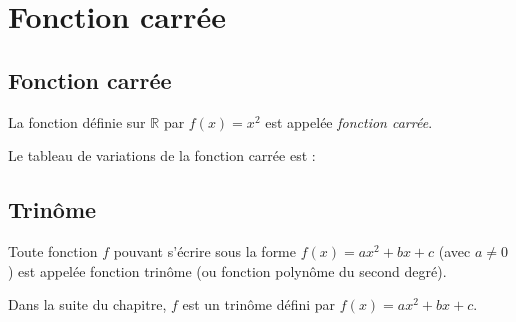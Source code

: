 \chapter{Fonction carrée}
\section{Fonction carrée}

\begin{definition}
  La fonction définie sur $\mathbb R$ par $f(x)=x^2$ est appelée \emph{fonction carrée}.
\end{definition}

\begin{propriete}[Variations]
  Le tableau de variations de la fonction carrée est :
  \begin{center}
    \hfill
  \end{center}

\end{propriete}

\section{Trinôme}

\begin{definition}
  Toute fonction $f$ pouvant s'écrire sous la forme $f(x)=ax^2+bx+c$ (avec $a\neq0$) est appelée fonction trinôme (ou fonction polynôme du second degré).
\end{definition}

\begin{em}
  Dans la suite du chapitre, $f$ est un trinôme défini par $f(x)=ax^2+bx+c$.
\end{em}

